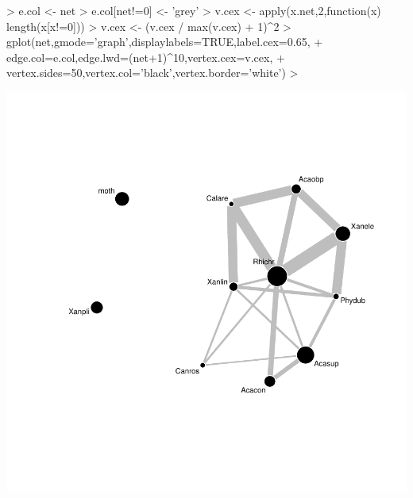 \documentclass[12pt]{article}
\begin{document}
\begin{Schunk}
\begin{Sinput}
> e.col <- net
> e.col[net!=0] <- 'grey'
> v.cex <- apply(x.net,2,function(x) length(x[x!=0]))
> v.cex <- (v.cex / max(v.cex) + 1)^2
> gplot(net,gmode='graph',displaylabels=TRUE,label.cex=0.65,
+       edge.col=e.col,edge.lwd=(net+1)^10,vertex.cex=v.cex,
+       vertex.sides=50,vertex.col='black',vertex.border='white')
> 
\end{Sinput}
\end{Schunk}
\includegraphics{SCRL-027}



\end{document}
